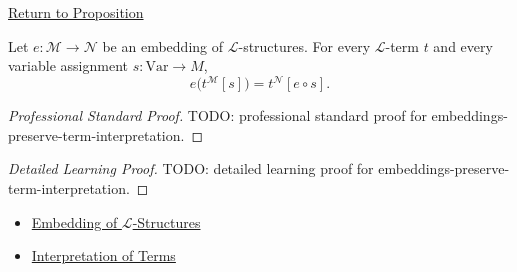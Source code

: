\newpage
{}
\label{prf:embeddings-preserve-term-interpretation}

\begin{remark*}[Return]
\hyperref[prop:embeddings-preserve-term-interpretation]{Return to Proposition}
\end{remark*}

\begin{proposition*}
Let $e\colon\mathcal{M}\to\mathcal{N}$ be an embedding of
$\mathcal{L}$-structures. For every $\mathcal{L}$-term $t$ and every variable
assignment $s\colon\mathrm{Var}\to M$,
\[
  e\bigl(t^{\mathcal{M}}[s]\bigr)
  =
  t^{\mathcal{N}}[e\circ s].
\]
\end{proposition*}

\begin{proof}[Professional Standard Proof]
\LRAProofBodyStart
TODO: professional standard proof for embeddings-preserve-term-interpretation.
\end{proof}

\begin{proof}[Detailed Learning Proof]
\LRAProofBodyStart
TODO: detailed learning proof for embeddings-preserve-term-interpretation.
\end{proof}

\begin{remark*}
\end{remark*}

\begin{dependencies}
\begin{itemize}
  \item \hyperref[def:l-structure-embedding]{Embedding of $\mathcal{L}$-Structures}
  \item \hyperref[def:term-interpretation]{Interpretation of Terms}
\end{itemize}
\end{dependencies}

\clearpage
